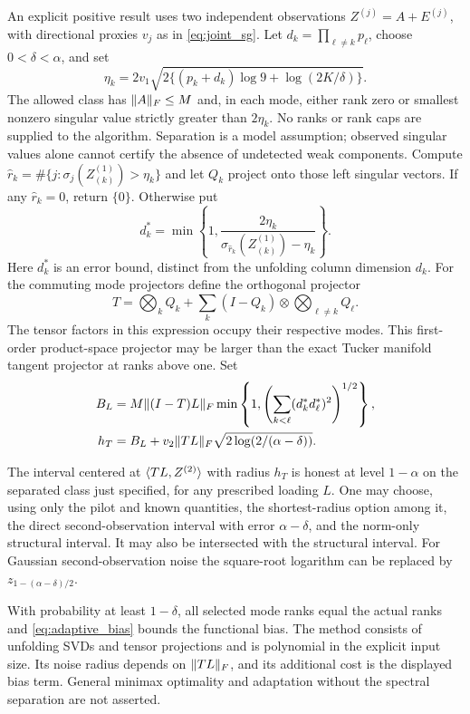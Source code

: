 An explicit positive result uses two independent observations
$Z^{(j)}=A+E^{(j)}$, with directional proxies $v_j$ as in \eqref{eq:joint_sg}. Let $d_k=\prod_{\ell\ne k}p_\ell$, choose $0<\delta<\alpha$, and set
\begin{equation}\label{eq:pilot_eta}
 \eta_k=2v_1\sqrt{2\{(p_k+d_k)\log9+\log(2K/\delta)\}}.
\end{equation}
The allowed class has $\lVert A\rVert_F\le M$ and, in each mode, either rank zero or smallest nonzero singular value strictly greater than $2\eta_k$. No ranks or rank caps are supplied to the algorithm. Separation is a model assumption; observed singular values alone cannot certify the absence of undetected weak components.
Compute $\widehat r_k=\#\{j:\sigma_j(Z^{(1)}_{(k)})>\eta_k\}$ and let $Q_k$ project onto those left singular vectors. If any $\widehat r_k=0$, return $\{0\}$. Otherwise put
\[
 d_k^*=\min\left\{1,\frac{2\eta_k}{\sigma_{\widehat r_k}(Z^{(1)}_{(k)})-\eta_k}\right\}.
\]
Here $d_k^*$ is an error bound, distinct from the unfolding column dimension $d_k$.
For the commuting mode projectors define the orthogonal projector
\[
 T=\bigotimes_k Q_k+
       \sum_k (I-Q_k)\otimes\bigotimes_{\ell\ne k}Q_\ell.
\]
The tensor factors in this expression occupy their respective modes. This first-order product-space projector may be larger than the exact Tucker manifold tangent projector at ranks above one. Set
\begin{align}
 B_L&=M\lVert (I-T)L\rVert_F
      \min\left\{1,\left(\sum_{k<\ell}(d_k^*d_\ell^*)^2\right)^{1/2}\right\},\label{eq:adaptive_bias}\\
 h_T&=B_L+v_2\lVert TL\rVert_F\sqrt{2\log(2/(\alpha-\delta))}.
\end{align}

\begin{theorem}\label{thm:adaptive_tangent}
The interval centered at $\langle TL,Z^{(2)}\rangle$ with radius $h_T$ is honest at level $1-\alpha$ on the separated class just specified, for any prescribed loading $L$. One may choose, using only the pilot and known quantities, the shortest-radius option among it, the direct second-observation interval with error $\alpha-\delta$, and the norm-only structural interval. It may also be intersected with the structural interval. For Gaussian second-observation noise the square-root logarithm can be replaced by $z_{1-(\alpha-\delta)/2}$.

With probability at least $1-\delta$, all selected mode ranks equal the actual ranks and \eqref{eq:adaptive_bias} bounds the functional bias. The method consists of unfolding SVDs and tensor projections and is polynomial in the explicit input size. Its noise radius depends on $\lVert TL\rVert_F$, and its additional cost is the displayed bias term. General minimax optimality and adaptation without the spectral separation are not asserted.
\end{theorem}

